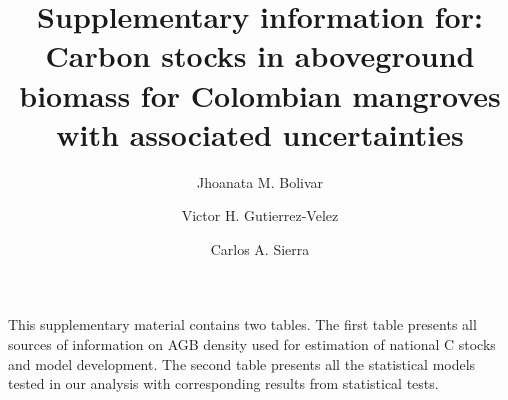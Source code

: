 \documentclass[authoryear]{elsarticle}   	%
\begin{document}
\begin{frontmatter}

\title{Supplementary information for: Carbon stocks in aboveground biomass for Colombian mangroves with associated uncertainties}
\author[MPI,CYB]{Jhoanata M. Bolivar}
\author[TU,CYB]{Victor H. Gutierrez-Velez}
\author[MPI,CYB]{Carlos A. Sierra}
\address[MPI]{Max Planck Institute for Biogeochemistry, Hans-Kn\"oll-Str. 10, 07745 Jena, Germany}
\address[CYB]{Research Center on Ecosystems and Global Change Carbono \& Bosques, Medell\'in, Colombia}
\address[TU]{Department of Geography and Urban Studies, Temple University, Philadelphia, PA 19122, USA}


\end{frontmatter}


This supplementary material contains two tables. The first table presents all sources of information on AGB density used for estimation of national C stocks and model development. The second table presents all the statistical models tested in our analysis with corresponding results from statistical tests. 
\end{document}
